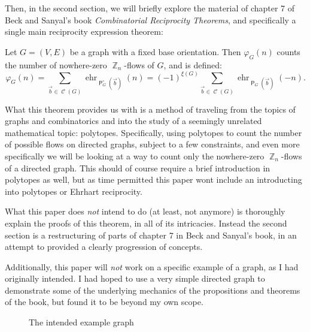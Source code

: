 \documentclass{amsart}
\DeclareMathOperator{\Z}{\mathbb{Z}}
\DeclareMathOperator{\sfP}{\mathsf{P}}
\DeclareMathOperator{\sgehr}{ehr}
\DeclareMathOperator{\calC}{\mathcal{C}}
\theoremstyle{plain}
\newtheorem*{THM*}{Theorem}
\theoremstyle{remark}
\theoremstyle{definition}
\newenvironment{thm*}%
  {\begin{leftbar}\begin{THM*}
}{%
  \end{THM*}\end{leftbar}
}
\begin{document}
Then, in the second section, we will briefly explore the material of
chapter 7 of Beck and Sanyal's book \emph{Combinatorial Reciprocity Theorems},
and specifically a single main reciprocity expression theorem:
\begin{thm*}
  Let $G=(V,E)$ be a graph with a fixed base orientation.
  Then $\varphi_G(n)$ counts the number of nowhere-zero $\Z_n$-flows of $G$,
  and is defined:
  \[
    \varphi_G(n)
    =\sum_{\vec b\in\calC(G)}\sgehr_{\sfP_G^\circ(\vec b)}(n)
    ={(-1)}^{\xi(G)}\sum_{\vec b\in\calC(G)}\sgehr_{\sfP_G(\vec b)}(-n).
  \]
\end{thm*}
What this theorem provides us with is a method of traveling from the topics of
graphs and combinatorics and into the study of a seemingly unrelated
mathematical topic: polytopes.
Specifically, using polytopes to count the number of possible flows
on directed graphs, subject to a few constraints,
and even more specifically we will be looking at a way to count only the
nowhere-zero $\Z_n$-flows of a directed graph.
This should of course require a brief introduction in polytopes as well,
but as time permitted this paper wont include an introducting into polytopes or
Ehrhart reciprocity.

What this paper does \emph{not} intend to do (at least, not anymore) is
thoroughly explain the proofs of this theorem, in all of its intricacies.
Instead the second section is a restructuring of parts of chapter 7 in
Beck and Sanyal's book, in an attempt to provided a clearly progression of
concepts.

Additionally, this paper will \emph{not} work on a specific example of a graph,
as I had originally intended. I had hoped to use a very simple directed
graph to demonstrate some of the underlying mechanics of the propositions and
theorems of the book, but found it to be beyond my own scope.
\begin{figure}[h]
  \caption{The intended example graph}
\end{figure}
\end{document}
